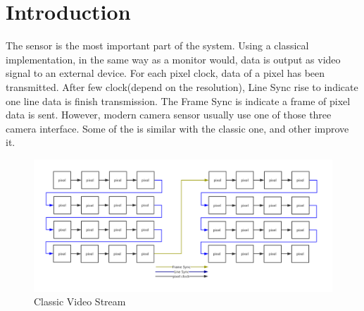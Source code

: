 \documentclass[12pt,article]{memoir}
\begin{document}
\section{Introduction}
The sensor is the most important part of the system. Using a classical implementation, in the same way as a monitor would, data is output as video signal to an external device. For each pixel clock, data of a pixel has been transmitted. After few clock(depend on the resolution), Line Sync rise to indicate one line data is finish transmission. The Frame Sync is indicate a frame of pixel data is sent. However, modern camera sensor usually use one of those three camera interface. Some of the is similar with the classic one, and other improve it.
\begin{figure}[htp]
\includegraphics[width=\textwidth]{img/DR00002_Cam.png}
 \caption{Classic Video Stream}	
\end{figure}
\newpage
\end{document}

